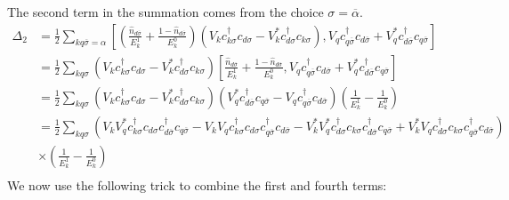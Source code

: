 The second term in the summation comes from the choice \(\sigma = \overline\alpha\).
\begin{equation}\begin{aligned}
	\Delta_2 &= \frac{1}{2}\sum_{kq\overline\sigma=\alpha}\left[\left(\frac{\hat n_{d\overline\sigma}}{E_k^1} + \frac{1 - \hat n_{d\overline\sigma}}{E_k^0}\right)\left(V_k c^\dagger_{k\sigma}c_{d\sigma} - V^*_k c^\dagger_{d\sigma}c_{k\sigma}\right),V_q c^\dagger_{q\overline\sigma}c_{d\overline\sigma} + V_q^* c^\dagger_{d\overline\sigma}c_{q\overline\sigma}\right]\\
		 &= \frac{1}{2}\sum_{kq\sigma}\left(V_k c^\dagger_{k\sigma}c_{d\sigma} - V^*_k c^\dagger_{d\sigma}c_{k\sigma}\right)\left[\frac{\hat n_{d\overline\sigma}}{E_k^1} + \frac{1 - \hat n_{d\overline\sigma}}{E_k^0},V_q c^\dagger_{q\overline\sigma}c_{d\overline\sigma} + V_q^* c^\dagger_{d\overline\sigma}c_{q\overline\sigma}\right]\\
		 &= \frac{1}{2}\sum_{kq\sigma}\left(V_k c^\dagger_{k\sigma}c_{d\sigma} - V^*_k c^\dagger_{d\sigma}c_{k\sigma}\right)\left(V_q^*c^\dagger_{d\overline\sigma}c_{q\overline\sigma} - V_q c^\dagger_{q\overline\sigma}c_{d\overline\sigma}\right)\left(\frac{1}{E_k^1} - \frac{1}{E_k^0}\right)\\
		 &= \frac{1}{2}\sum_{kq\sigma}\left(V_k V_q^* c^\dagger_{k\sigma}c_{d\sigma} c^\dagger_{d\overline\sigma}c_{q\overline\sigma} - V_k V_q c^\dagger_{k\sigma}c_{d\sigma} c^\dagger_{q\overline\sigma}c_{d\overline\sigma} - V^*_k V_q^* c^\dagger_{d\sigma}c_{k\sigma} c^\dagger_{d\overline\sigma}c_{q\overline\sigma} + V^*_k V_q c^\dagger_{d\sigma}c_{k\sigma} c^\dagger_{q\overline\sigma}c_{d\overline\sigma}\right)\\
		 &\times\left(\frac{1}{E_k^1} - \frac{1}{E_k^0}\right)\\
\end{aligned}\end{equation}
We now use the following trick to combine the first and fourth terms:

